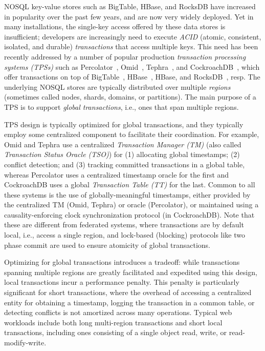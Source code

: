
NOSQL key-value stores such as BigTable, HBase, and RocksDB have increased in popularity over the past few years, and are now very widely deployed. Yet in many installations, the single-key access offered by these data stores is insufficient; developers are increasingly need 
to execute \emph{ACID} (atomic, consistent, isolated, and durable) \emph{transactions} that access multiple keys.
This need has been recently addressed by a number of popular production \emph{transaction processing systems (TPSs)} 
such as  Percolator~\cite{Percolator2010}, Omid~\cite{OmidICDE2014}, Tephra~\cite{tephra}, and CockroachDB~\cite{cockroach}, 
which offer transactions on top of  BigTable~\cite{bigtable-osdi06}, HBase~\cite{hbase}, HBase, and RocksDB~\cite{rocksdb}, resp. 
The underlying NOSQL stores are typically distributed  over multiple \emph{regions} (sometimes called nodes, shards, domains, or partitions).
The main purpose of a TPS is to support \emph{global transactions}, i.e., ones that span multiple regions.

TPS design is typically optimized for global transactions, and they typically employ some centralized component to facilitate their coordination. 
For example, Omid and Tephra use a centralized \emph{Transaction Manager (TM)} 
(also called \emph{Transaction Status Oracle (TSO)}) for (1) allocating global timestamps; (2) conflict detection; 
and (3) tracking committed transactions in a global table, 
whereas  Percolator uses a centralized timestamp oracle for the first 
and CockroachDB uses a global \emph{Transaction Table (TT)} for the last. 
Common to all these systems is the use of globally-meaningful timestamps, either provided by the centralized TM (Omid, Tephra) or oracle (Percolator), or maintained using a causality-enforcing clock synchronization protocol (in CockroachDB).
Note that these are different from federated systems, where transactions are by default local, i.e.,
access a single region, and lock-based (blocking) protocols like two phase commit are used to ensure atomicity of global transactions.

Optimizing for global transactions introduces a tradeoff: while transactions spanning
multiple regions are greatly facilitated and expedited using this design, local
transactions incur a performance penalty. This penalty is particularly
significant for short transactions, where the overhead of accessing 
a centralized entity for obtaining a timestamp, logging the transaction in a common table, or detecting conflicts 
is not amortized across many operations. Typical web workloads include both long
multi-region transactions and short local transactions, including ones
consisting of a single object read, write, or read-modify-write.

